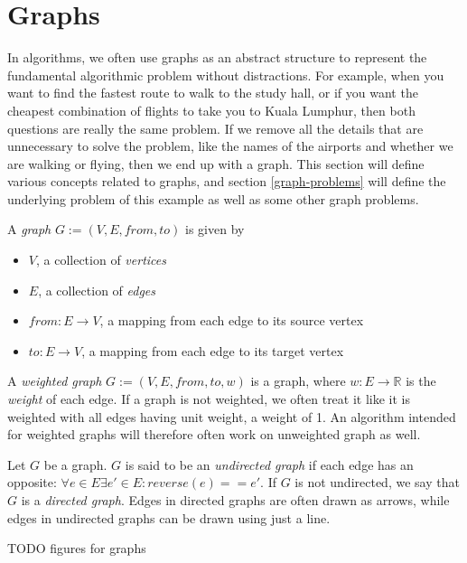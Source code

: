 \section{Graphs}
\label{graphs}
In algorithms, we often use graphs as an abstract structure to represent the fundamental algorithmic problem without distractions. For example, when you want to find the fastest route to walk to the study hall, or if you want the cheapest combination of flights to take you to Kuala Lumphur, then both questions are really the same problem. If we remove all the details that are unnecessary to solve the problem, like the names of the airports and whether we are walking or flying, then we end up with a graph. This section will define various concepts related to graphs, and section \ref{graph-problems} will define the underlying problem of this example as well as some other graph problems.

\begin{definition}[Graph]
    A \emph{graph} $G := (V, E, from, to)$ is given by
\begin{itemize}
    \item $V$, a collection of \emph{vertices}
    \item $E$, a collection of \emph{edges}
    \item $from : E \rightarrow V$, a mapping from each edge to its source vertex
    \item $to : E \rightarrow V$, a mapping from each edge to its target vertex 
\end{itemize}
\end{definition}

\begin{definition}
    A \emph{weighted graph} $G := (V, E, from, to, w)$ is a graph, where $w : E \rightarrow \mathbb{R}$ is the \emph{weight} of each edge. If a graph is not weighted, we often treat it like it is weighted with all edges having unit weight, a weight of 1. An algorithm intended for weighted graphs will therefore often work on unweighted graph as well.
\end{definition}

\begin{definition}
    Let $G$ be a graph. $G$ is said to be an \emph{undirected graph} if each edge has an opposite: $\forall e \in E \exists e' \in E : reverse(e) == e'$.
    If $G$ is not undirected, we say that $G$ is a \emph{directed graph}.
    Edges in directed graphs are often drawn as arrows, while edges in undirected graphs can be drawn using just a line.

    TODO figures for graphs
\end{definition}

